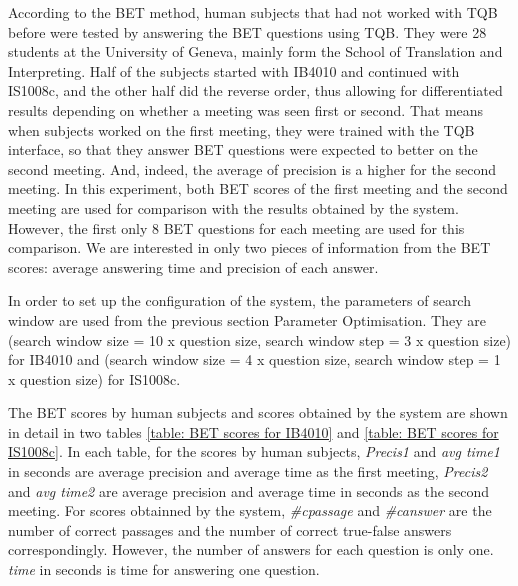 According to the BET method, human subjects that had not worked with TQB before were tested by answering the BET questions using TQB. They were 28 students at the University of Geneva, mainly form the School of Translation and Interpreting. Half of the subjects started with IB4010 and continued with IS1008c, and the other half did the reverse order, thus allowing for differentiated results depending on whether a meeting was seen first or second. That means when subjects worked on the first meeting, they were trained with the TQB interface, so that they answer BET questions were expected to better on the second meeting. And, indeed, the average of precision is a higher for the second meeting. In this experiment, both BET scores of the first meeting and the second meeting are used for comparison with the results obtained by the system. However, the first only 8 BET questions for each meeting are used for this comparison.  We are interested in only two pieces of information from the BET scores: average answering time and precision of each answer. 

In order to set up the configuration of the system, the parameters of search window are used from the previous section Parameter Optimisation. They are (search window size = 10 x question size, search window step = 3 x question size) for IB4010 and (search window size = 4 x question size, search window step = 1 x question size) for IS1008c.

The BET scores by human subjects and scores obtained by the system are shown in detail in two tables \ref{table: BET scores for IB4010} and \ref{table: BET scores for IS1008c}. In each table, for the scores by human subjects, \textit{Precis1} and \textit{avg time1} in seconds are average precision and average time as the first meeting, \textit{Precis2} and \textit{avg time2} are average precision and average time in seconds as the second meeting. For scores obtainned by the system, \textit{\#cpassage} and \textit{\#canswer} are the number of correct passages and the number of correct true-false answers correspondingly. However, the number of answers for each question is only one. \textit{time} in seconds is time for answering one question.




